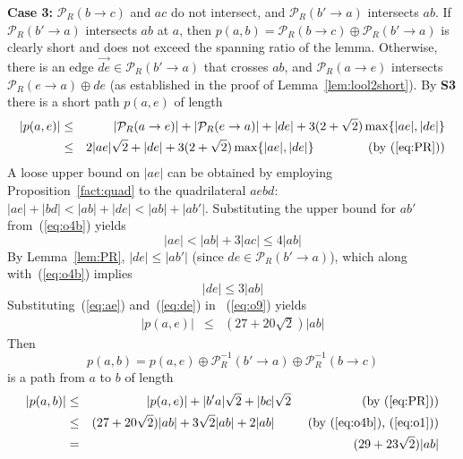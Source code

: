 \pdfoutput=1  \documentclass[11pt]{article}
\newcommand{\Pa}{{\mathcal P}}
\begin{document}
\medskip
\noindent
{\bf Case 3:} $\Pa_R(b \rightarrow c)$ and $ac$ do not intersect,
and $\Pa_R(b' \rightarrow a)$ intersects $ab$.
If $\Pa_R(b' \rightarrow a)$ intersects $ab$ at $a$, then
$p(a,b) = \Pa_R(b \rightarrow c) \oplus \Pa_R(b' \rightarrow a)$ is clearly short and
does not exceed the spanning ratio of the lemma.
Otherwise, there is an edge $\overrightarrow{de} \in \Pa_R(b' \rightarrow a)$
that crosses $ab$, and
$\Pa_R(a \rightarrow e)$ intersects $\Pa_R(e \rightarrow a) \oplus de$
(as established in the proof of Lemma~\ref{lem:lool2short}).
By {\bf S3} there is a short path $p(a,e)$ of length
\begin{eqnarray}
\nonumber |p(a,e)| & \le & |\Pa_R(a \rightarrow e)| + |\Pa_R(e \rightarrow a)| + |de| +  3(2+\sqrt{2}) \max\{|ae|, |de|\} \\
                   & \le & 2|ae|\sqrt{2} + |de| + 3(2+\sqrt{2}) \max\{|ae|, |de|\} ~~~~~~~~~~~~~\mbox{(by~(\ref{eq:PR}))}
\label{eq:o9}
\end{eqnarray}
A loose upper bound on $|ae|$ can be obtained by employing
Proposition~\ref{fact:quad}
to the quadrilateral
$aebd$: $|ae| + |bd| < |ab| + |de| < |ab| + |ab'|$. Substituting the upper bound for
$ab'$ from~(\ref{eq:o4b}) yields
\begin{equation}
|ae| < |ab| + 3|ac| \le 4|ab|
\label{eq:ae}
\end{equation}
By Lemma~\ref{lem:PR}, $|de| \le |ab'|$ (since $de \in \Pa_R(b' \rightarrow a)$), which
along with~(\ref{eq:o4b}) implies
\begin{equation}
|de| \le 3|ab|
\label{eq:de}
\end{equation}
Substituting~(\ref{eq:ae}) and~(\ref{eq:de}) in ~(\ref{eq:o9}) yields
\begin{eqnarray}
\nonumber |p(a,e)| & \le & (27 + 20\sqrt{2})|ab|
\label{eq:oA}
\end{eqnarray}
Then
$$
p(a,b) = p(a,e) \oplus \Pa_R^{-1}(b' \rightarrow a) \oplus  \Pa_R^{-1}(b \rightarrow c)
$$
is a path from $a$ to $b$ of length
\begin{eqnarray*}
\nonumber |p(a,b)| & \le & |p(a,e)| + |b'a|\sqrt{2} + |bc|\sqrt{2} ~~~~~~~~~~~~~~~~~\mbox{(by~(\ref{eq:PR}))} \\
                   & \le & (27 + 20\sqrt{2})|ab| + 3\sqrt{2}|ab| + 2|ab| ~~~~~~~~\mbox{(by~(\ref{eq:o4b}),~(\ref{eq:o1}))} \\
                   & = & (29 + 23\sqrt{2})|ab|
\end{eqnarray*}
\end{document}
